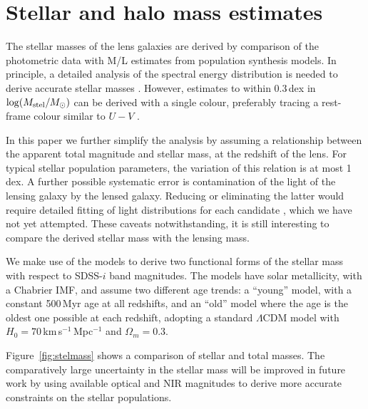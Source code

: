 \section{Stellar and halo mass estimates}\label{sec:stellar-mass}

The stellar masses of the lens galaxies are derived by comparison of
the photometric data with M/L estimates from population synthesis
models.  In principle, a detailed analysis of the spectral energy
distribution is needed to derive accurate stellar masses
\citep[e.g.][]{2009ApJS..185..253G,2011MNRAS.418.1587T}.  However,
estimates to within 0.3\,dex in $\log(M_\text{stel}/M_\odot)$ can be derived
with a single colour, preferably tracing a rest-frame colour similar
to $U-V$ \citep[see Fig.~1 of][]{2008MNRAS.383..857F}. 

In this paper we further simplify the analysis by assuming a
relationship between the apparent total magnitude and stellar mass, at
the redshift of the lens.  For typical stellar population parameters,
the variation of this relation is at most 1\,dex.  A further possible
systematic error is contamination of the light of the lensing galaxy
by the lensed galaxy.  Reducing or eliminating the latter would
require detailed fitting of light distributions for each candidate
\citep[see][]{2011ApJ...740...97L}, which we have not yet attempted.  These 
caveats notwithstanding, it is still interesting to compare the derived
stellar mass with the lensing mass.

We make use of the \citet{2003MNRAS.344.1000B} models to derive two
functional forms of the stellar mass with respect to SDSS-$i$ band
magnitudes. The models have solar metallicity, with a Chabrier IMF,
and assume two different age trends: a ``young'' model, with a
constant 500\,Myr age at all redshifts, and an ``old'' model where the
age is the oldest one possible at each redshift, adopting a standard
$\Lambda$CDM model with $H_0=70$\,km\,s$^{-1}$\,Mpc$^{-1}$ and
$\Omega_m=0.3$.

Figure~\ref{fig:stelmass}
shows a comparison of stellar and total masses.  The comparatively
large uncertainty in the stellar mass will be improved in future work
by using available optical and NIR magnitudes to derive more accurate
constraints on the stellar populations.

